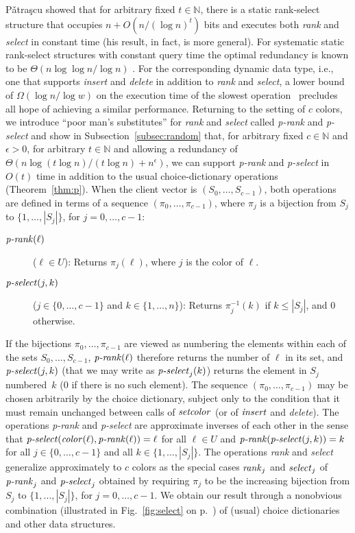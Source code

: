 \documentclass[envcountsame,envcountsect,undated,nolinenumbers]{lnthi}
\def\Tvn#1{\hbox{\textit{#1\/}}}
\def\TbbbN{\mathbb{N}}
\begin{document}
P\v atra\c scu showed that for
arbitrary fixed $t\in\TbbbN$, there is a
static rank-select structure that occupies
$n+O({n/{(\log n)^t}})$ bits and executes
both \Tvn{rank} and \Tvn{select} in constant time
\cite[Theorem~2]{Pat08} (his result, in fact, is more general).
For systematic static rank-select structures
with constant query time
the optimal redundancy is known to be
$\Theta({{n\log\log n}/{\log n}})$
\cite{Gol07,RamRS07}.
For the corresponding dynamic data type,
i.e., one that supports \Tvn{insert} and
\Tvn{delete} in addition to \Tvn{rank}
and \Tvn{select}, a lower bound of
$\Omega({{\log n}/{\log w}})$ on the execution
time of the slowest operation~\cite{FreS89}
precludes all hope of achieving a similar performance.
Returning to the setting of $c$ colors,
we introduce ``poor man's substitutes'' for
\Tvn{rank} and \Tvn{select} called
\Tvn{p-rank} and \Tvn{p-select} and show
in Subsection~\ref{subsec:random} that,
for arbitrary fixed $c\in\TbbbN$ and
$\epsilon>0$, for arbitrary
$t\in\TbbbN$ and allowing a redundancy of
$\Theta({{n\log(t\log n)}/{(t\log n)}}+n^\epsilon)$,
we can support \Tvn{p-rank} and \Tvn{p-select}
in $O(t)$ time in addition
to the usual choice-dictionary operations
(Theorem~\ref{thm:p}).
When the client vector is $(S_0,\ldots,S_{c-1})$,
both operations are defined in terms of a
sequence $(\pi_0,\ldots,\pi_{c-1})$, where
$\pi_j$ is a bijection from $S_j$ to
$\{1,\ldots,|S_j|\}$, for $j=0,\ldots,c-1$:

\begin{description}
\item[\normalfont$\Tvn{p-rank}(\ell)$]
($\ell\in U$):
Returns $\pi_j(\ell)$, where $j$ is the
color of $\ell$.
\item[\normalfont$\Tvn{p-select}(j,k)$]
($j\in\{0,\ldots,c-1\}$ and $k\in\{1,\ldots,n\}$):
Returns $\pi_j^{-1}(k)$ if $k\le|S_j|$, and 0 otherwise.
\end{description}

If the bijections $\pi_0,\ldots,\pi_{c-1}$ are viewed
as numbering the elements within each of the sets
$S_0,\ldots,S_{c-1}$, $\Tvn{p-rank}(\ell)$ therefore
returns the number of $\ell$ in its set,
and $\Tvn{p-select}(j,k)$ (that we may write
as $\Tvn{p-select}_j(k)$) returns the element
in $S_j$ numbered~$k$ (0 if there is no such element).
The sequence $(\pi_0,\ldots,\pi_{c-1})$
may be chosen arbitrarily by the choice dictionary,
subject only to the condition that it must remain
unchanged between calls of $\Tvn{setcolor}$
(or of $\Tvn{insert}$ and \Tvn{delete}).
The operations \Tvn{p-rank} and \Tvn{p-select} are
approximate inverses of each other in the sense that
$\Tvn{p-select}(\Tvn{color}(\ell),\Tvn{p-rank}(\ell))=\ell$
for all $\ell\in U$ and
$\Tvn{p-rank}(\Tvn{p-select}(j,k))=k$
for all $j\in\{0,\ldots,c-1\}$ and all
$k\in\{1,\ldots,|S_j|\}$.
The operations \Tvn{rank} and \Tvn{select}
generalize approximately to $c$ colors
as the special cases $\Tvn{rank}_j$ and
$\Tvn{select}_j$ of $\Tvn{p-rank}_j$ and $\Tvn{p-select}_j$
obtained by requiring $\pi_j$ to be the increasing
bijection from $S_j$ to $\{1,\ldots,|S_j|\}$,
for $j=0,\ldots,c-1$.
We obtain our result through a nonobvious combination
(illustrated in Fig.~\ref{fig:select}
on p.~\pageref{fig:select})
of (usual) choice dictionaries and other data structures.
\end{document}

